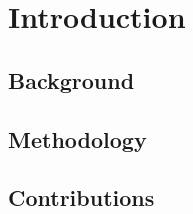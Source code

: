 \documentclass[12pt, letterpaper]{report}   %
\begin{document}
\begingroup
  \hypersetup{linkbordercolor=white,linkcolor=black,
    filecolor=black, urlcolor=black}  
    
\tableofcontents


\newpage
{}
\listoftables

\newpage
{}
\listoffigures
\endgroup


% 

\newpage
\endofprelim
\cleardoublepage





\chapter{Introduction}
\label{introduction}



\section{Background}
\label{sec:intro-background}


\section{Methodology}
\label{sec:intro-methodology}


\section{Contributions}
\label{sec:intro-contribution}

\end{document}
